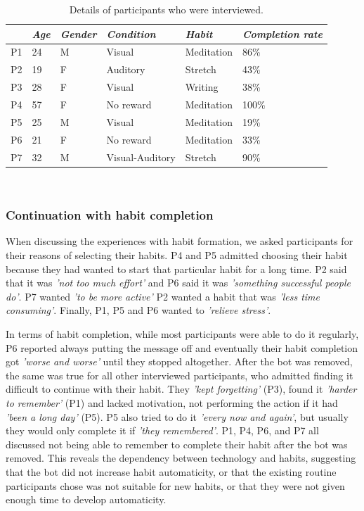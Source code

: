 \documentclass{scaffold/sigchi}
\begin{document}
\begin{table}[b]
  \begin{tabular}{l l l l l l}
    \multicolumn{1}{l}{\small \textit{~}} &
    \multicolumn{1}{l}{\small \textit{Age}} & 
    \multicolumn{1}{l}{\small \textit{Gender}} & 
    \multicolumn{1}{l}{\small \textit{Condition}} &
    \multicolumn{1}{l}{\small \textit{Habit}} &
    \multicolumn{1}{p{1cm}}{\small \textit{Completion rate}} \\
    \midrule
    P1 & 24 & M & Visual & Meditation & 86\% \\
    P2 & 19 & F & Auditory & Stretch & 43\% \\ 
    P3 & 28 & F & Visual & Writing & 38\% \\
    P4 & 57 & F & No reward & Meditation & 100\% \\ 
    P5 & 25 & M & Visual & Meditation & 19\% \\ 
    P6 & 21 & F & No reward & Meditation & 33\% \\ 
    P7 & 32 & M & Visual-Auditory & Stretch & 90\% \\
  \end{tabular}
  \caption{Details of participants who were interviewed.}~\label{table:transcript_participant_breakdown}
\end{table}

\subsubsection{Continuation with habit completion}
When discussing the experiences with habit formation, we asked participants for their reasons of selecting their habits. P4 and P5 admitted choosing their habit because they had wanted to start that particular habit for a long time. P2 said that it was \textit{'not too much effort'} and P6 said it was \textit{'something successful people do'}. P7 wanted \textit{'to be more active'} P2 wanted a habit that was \textit{'less time consuming'}. Finally, P1, P5 and P6 wanted to \textit{'relieve stress'}. 

In terms of habit completion, while most participants were able to do it regularly, P6 reported always putting the message off and eventually their habit completion got \textit{'worse and worse'} until they stopped altogether. After the bot was removed, the same was true for all other interviewed participants, who admitted finding it difficult to continue with their habit. They \textit{'kept forgetting'} (P3), found it \textit{'harder to remember'} (P1) and lacked motivation, not performing the action if it had \textit{'been a long day'} (P5). P5 also tried to do it \textit{'every now and again'}, but usually they would only complete it if \textit{'they remembered'}. P1, P4, P6, and P7 all discussed not being able to remember to complete their habit after the bot was removed. This reveals the dependency between technology and habits, suggesting that the bot did not increase habit automaticity, or that the existing routine participants chose was not suitable for new habits, or that they were not given enough time to develop automaticity.
\end{document}

